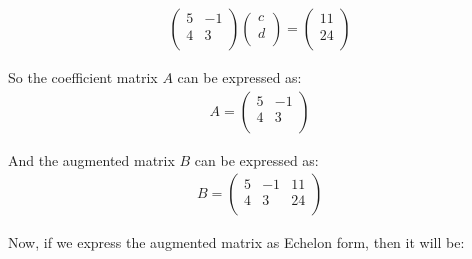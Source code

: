 \begin{equation}
\begin{aligned}
      \begin{pmatrix}
      5       & -1\\ 
      4       & 3\\
            
    \end{pmatrix} \begin{pmatrix}
      c\\ 
      d\\
            
    \end{pmatrix} = \begin{pmatrix}
      11\\ 
      24\\
            
    \end{pmatrix} 
\end{aligned}
\end{equation}

So the coefficient matrix $A$ can be expressed as:\\

\begin{equation}
\begin{aligned}
    A=  \begin{pmatrix}
      5       & -1\\ 
      4       & 3\\
            
    \end{pmatrix} 
\end{aligned}
\end{equation}

And the augmented matrix $B$ can be expressed as:\\

\begin{equation}
\begin{aligned}
    B=  \begin{pmatrix}
      5       & -1   & 11\\ 
      4       & 3   & 24\\
            
    \end{pmatrix} 
\end{aligned}
\end{equation}

Now, if we express the augmented matrix as Echelon form, then it will be:\\

